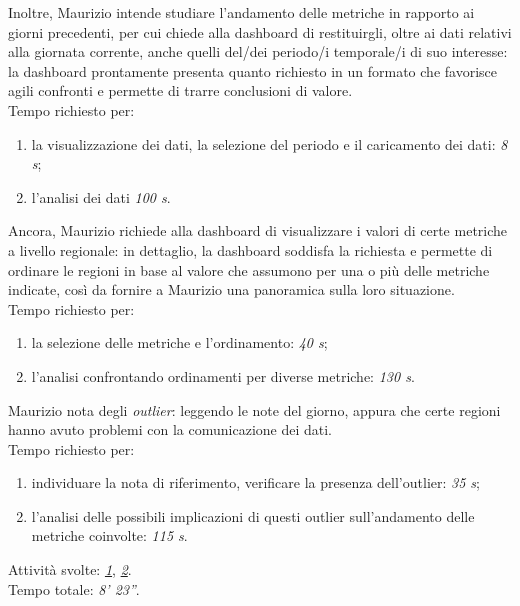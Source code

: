 Inoltre, Maurizio intende studiare l'andamento delle metriche in rapporto ai giorni precedenti, per cui chiede alla dashboard di restituirgli, oltre ai dati relativi alla giornata corrente, anche quelli del/dei periodo/i temporale/i di suo interesse: la dashboard prontamente presenta quanto richiesto in un formato che favorisce agili confronti e permette di trarre conclusioni di valore.\\
Tempo richiesto per:
\begin{enumerate}
    \item la visualizzazione dei dati, la selezione del periodo e il caricamento dei dati: \textit{8 s};
    \item l'analisi dei dati \textit{100 s}.
\end{enumerate}\noindent

Ancora, Maurizio richiede alla dashboard di visualizzare i valori di certe metriche a livello regionale: in dettaglio, la dashboard soddisfa la richiesta e permette di ordinare le regioni in base al valore che assumono per una o più delle metriche indicate, così da fornire a Maurizio una panoramica sulla loro situazione.\\
Tempo richiesto per:
\begin{enumerate}
    \item la selezione delle metriche e l'ordinamento: \textit{40 s};
    \item l'analisi confrontando ordinamenti per diverse metriche: \textit{130 s}.
\end{enumerate}\noindent

Maurizio nota degli \textit{outlier}:  leggendo le note del giorno, appura che certe regioni hanno avuto problemi con la comunicazione dei dati.\\
Tempo richiesto per:
\begin{enumerate}
    \item individuare la nota di riferimento, verificare la presenza dell'outlier: \textit{35 s};
    \item l'analisi delle possibili implicazioni di questi outlier sull'andamento delle metriche coinvolte: \textit{115 s}.
\end{enumerate}\noindent

Attività svolte: \hyperref[itm:1]{\textit{1}}, \hyperref[itm:2]{\textit{2}}.\\ 
Tempo totale: \textit{8' 23''}. 

